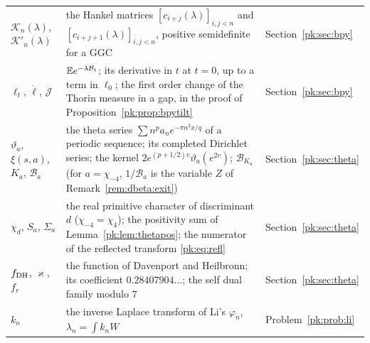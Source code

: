 {\begin{longtable}{@{}p{}p{}p{}@{}}
$\mathcal K_n(\lambda)$, $\mathcal K'_n(\lambda)$ & \raggedright the Hankel matrices ${[c_{i+j}(\lambda)]_{i,j<n}}$ and ${[c_{i+j+1}(\lambda)]_{i,j<n}}$, positive semidefinite for a GGC & \raggedright Section~\ref{pk:sec:bpy}\tabularnewline
$\ell_t$, $\dot\ell$, $\mathcal J$ & \raggedright ${\mathbb{E} e^{-\lambda\mathcal B_t}}$; its derivative in $t$ at ${t=0}$, up to a term in $\ell_0$; the first order change of the Thorin measure in a gap, in the proof of Proposition~\ref{pk:prop:bpytilt} & \raggedright Section~\ref{pk:sec:bpy}\tabularnewline
$\vartheta_a$, $\xi(s,a)$, $K_a$, $\mathcal B_a$ & \raggedright the theta series ${\sum n^pa_ne^{-\pi n^2x/q}}$ of a periodic sequence; its completed Dirichlet series; the kernel ${2e^{(p+1/2)v}\vartheta_a(e^{2v})}$; ${\mathcal B_{K_a}}$ (for ${a=\chi_{-4}}$, $1/\mathcal B_a$ is the variable $Z$ of Remark~\ref{rem:dbeta:exit}) & \raggedright Section~\ref{pk:sec:theta}\tabularnewline
$\chi_d$, $S_a$, $\Sigma_a$ & \raggedright the real primitive character of discriminant $d$ (${\chi_{-4}=\chi_4}$); the positivity sum of Lemma~\ref{pk:lem:thetapos}; the numerator of the reflected transform \eqref{pk:eq:refl} & \raggedright Section~\ref{pk:sec:theta}\tabularnewline
$f_{\rm DH}$, $\varkappa$, $f_r$ & \raggedright the function of Davenport and Heilbronn; its coefficient ${0.28407904\ldots}$; the self dual family modulo $7$ & \raggedright Section~\ref{pk:sec:theta}\tabularnewline
$k_n$ & \raggedright the inverse Laplace transform of Li's $\varphi_n$, ${\lambda_n=\int k_nW}$ & \raggedright Problem~\ref{pk:prob:li}\tabularnewline
\bottomrule
\end{longtable}}

